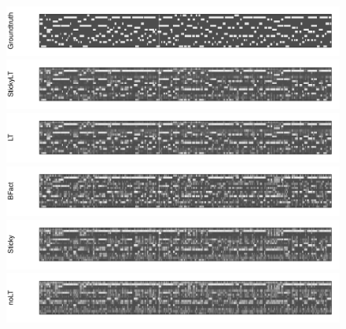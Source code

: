 \begin{figure}[tb]
\begin{center}
  \centerline{\includegraphics[width = \textwidth, height = 0.2\textwidth]{fig/cocktail/synth_s16_m12/hyper_h/h10.0_nocs_cp0/a5b0p01/groundtruth.pdf}}
  \centerline{\includegraphics[width = \textwidth, height = 0.2\textwidth]{fig/cocktail/synth_s16_m12/hyper_h/h10.0_nocs_cp0/a5b0p01/StickyLT_hdp_hmm_w0_ah5_bh0p01/binary_state.pdf}}
  \centerline{\includegraphics[width = \textwidth, height = 0.2\textwidth]{fig/cocktail/synth_s16_m12/hyper_h/h10.0_nocs_cp0/a5b0p01/LT_hdp_hmm_w0_ah5_bh0p01/binary_state.pdf}}
  \centerline{\includegraphics[width = \textwidth, height = 0.2\textwidth]{fig/cocktail/synth_s16_m12/hyper_h/h10.0_nocs_cp0/a5b0p01/BFact_hmm_w0_ah5_bh0p01/binary_state.pdf}}
  \centerline{\includegraphics[width = \textwidth, height = 0.2\textwidth]{fig/cocktail/synth_s16_m12/hyper_h/h10.0_nocs_cp0/a5b0p01/Sticky_hdp_hmm_w0_ah5_bh0p01/binary_state.pdf}}
  \centerline{\includegraphics[width = \textwidth, height = 0.2\textwidth]{fig/cocktail/synth_s16_m12/hyper_h/h10.0_nocs_cp0/a5b0p01/noLT_hdp_hmm_w0_ah5_bh0p01/binary_state.pdf}}

\end{center}
\end{figure}
